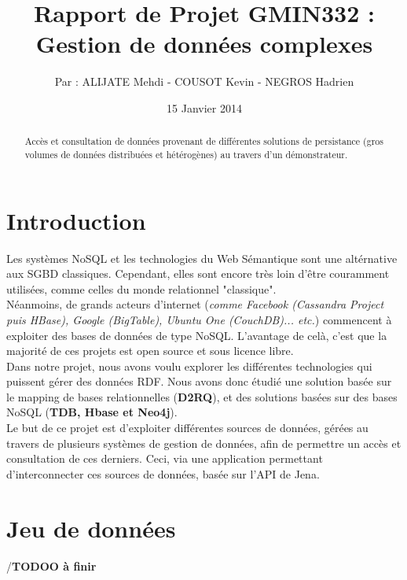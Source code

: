 \documentclass{article}
\title{Rapport de Projet GMIN332 :\\ Gestion de données complexes}
\author{Par : ALIJATE Mehdi - COUSOT Kevin - NEGROS Hadrien}
\date{15 Janvier 2014}
\begin{document}
\maketitle
\tableofcontents

\begin{abstract}
Accès et consultation de données provenant de différentes solutions de persistance (gros volumes de données distribuées et hétérogènes) au travers d'un démonstrateur.
\end{abstract}








\newpage 
\section{Introduction}\label{sec:intro}
Les systèmes NoSQL et les technologies du Web Sémantique sont une altérnative aux SGBD classiques. Cependant, elles sont encore très loin d'être couramment utilisées, comme celles du monde relationnel "classique". \\
Néanmoins, de grands acteurs d'internet (\textit{comme Facebook (Cassandra Project puis HBase), Google (BigTable), Ubuntu One (CouchDB)... etc.}) commencent à exploiter des bases de données de type NoSQL. L'avantage de celà, c'est que la majorité de ces projets est open source et sous licence libre.
\\
Dans notre projet, nous avons voulu explorer les différentes technologies qui puissent gérer des données RDF. Nous avons donc étudié une solution basée sur le mapping de bases relationnelles (\textbf{D2RQ}), et des solutions basées sur des bases NoSQL (\textbf{TDB, Hbase et Neo4j}).
\\
Le but de ce projet est d’exploiter différentes sources de données, gérées au travers de plusieurs systèmes de gestion de données, afin de permettre un accès et consultation de ces derniers. Ceci, via une application permettant d'interconnecter ces sources de données, basée sur l'API de Jena.






\section{Jeu de données}
/\textbf{TODOO à finir}\\
\end{document}
